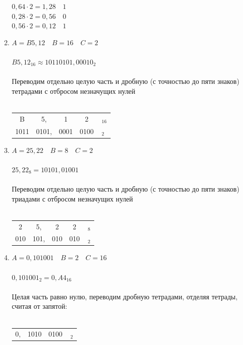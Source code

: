 \documentclass[11pt]{article}
\begin{document}
\begin{paracol}{2}
\begin{enumerate}
    $0,64 \cdot 2 = 1,28 \quad 1$\\
    $0,28 \cdot 2 = 0,56 \quad 0$\\
    $0,56 \cdot 2 = 0,12 \quad 1$\\
    \item$A = B5,12\quad B = 16\quad C = 2$
    \\\\
    $B5,12_{16} \approx 10110101,00010_2$
    \\\\
    \switchcolumn
    Переводим отдельно целую часть и дробную
    (с точностью до пяти знаков)
    тетрадами с отбросом незначущих нулей
    \\\\
    \begin{tabular}{|c|c|c|c|@{}l}
    \cline{1-4}
    B & 5, & 1 & 2 & $\,_{16}$\\
    \cline{1-4}
    1011 & 0101, & 0001 & 0100 & $\,_2$\\
    \cline{1-4}
    \end{tabular}
    \setcounter{enumi}{5}
    \item$A = 25,22\quad B = 8\quad C = 2$
    \\\\
    $25,22_8 = 10101,01001$
    \\\\
    Переводим отдельно целую часть и дробную
    (с точностью до пяти знаков)
    триадами с отбросом незначущих нулей
    \\\\
    \begin{tabular}{|c|c|c|c|@{}l}
    \cline{1-4}
    2 & 5, & 2 & 2 & $\,_8$\\
    \cline{1-4}
    010 & 101, & 010 & 010 & $\,_2$\\
    \cline{1-4}
    \end{tabular}
    \item$A = 0,101001\quad B = 2\quad C = 16$
    \\\\
    $0,101001_{2} = 0,A4_{16}$
    \\\\
    Целая часть равно нулю, переводим дробную
    тетрадами, отделяя тетрады,
    считая от запятой:
    \\\\
    \begin{tabular}{c|c|c|@{}l}
    \cline{2-3}
    0, & 1010 & 0100 & $\,_2$\\
    \cline{2-3}

\end{tabular}
\end{enumerate}
\end{paracol}
\end{document}
